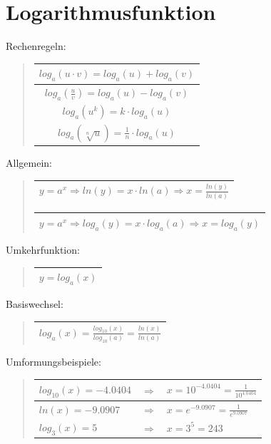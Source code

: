\section*{Logarithmusfunktion}

Rechenregeln:
\begin{verse}
\begin{tabular}{|c|}
\hline 
$log_{a}(u\cdot v)=log_{a}(u)+log_{a}(v)$\tabularnewline
\hline 
$log_{a}(\frac{u}{v})=log_{a}(u)-log_{a}(v)$\tabularnewline
\hline 
$log_{a}(u^{k})=k\cdot log_{a}(u)$\tabularnewline
\hline 
$log_{a}(\sqrt[n]{u})=\frac{1}{n}\cdot log_{a}(u)$\tabularnewline
\hline 
\end{tabular}
\end{verse}
Allgemein:
\begin{verse}
\begin{tabular}{|c|}
\hline 
$y=a^{x}\Rightarrow ln(y)=x\cdot ln(a)\Rightarrow x=\frac{ln(y)}{ln(a)}$\tabularnewline
\hline 
\end{tabular}

\begin{tabular}{|c|}
\hline 
$y=a^{x}\Rightarrow log_{a}(y)=x\cdot log_{a}(a)\Rightarrow x=log_{a}(y)$ \tabularnewline
\hline 
\end{tabular}
\end{verse}
Umkehrfunktion:
\begin{verse}
\begin{tabular}{|c|}
\hline 
$y=log_{a}(x)$\tabularnewline
\hline 
\end{tabular}
\end{verse}
Basiswechsel:
\begin{verse}
\begin{tabular}{|c|}
\hline 
$log_{a}(x)=\frac{log_{10}(x)}{log_{10}(a)}=\frac{ln(x)}{ln(a)}$\tabularnewline
\hline 
\end{tabular}
\end{verse}
Umformungsbeispiele:
\begin{verse}
\begin{tabular}{|l|l|l|}
\hline 
$log_{10}(x)=-4.0404$ & $\Rightarrow$ & $x=10^{-4.0404}=\frac{1}{10^{4.0404}}$\tabularnewline
\hline 
$ln(x)=-9.0907$ & $\Rightarrow$ & $x=e^{-9.0907}=\frac{1}{e^{9.0907}}$\tabularnewline
\hline 
$log_{3}(x)=5$ & $\Rightarrow$ & $x=3^{5}=243$\tabularnewline
\hline 
\end{tabular}\end{verse}

